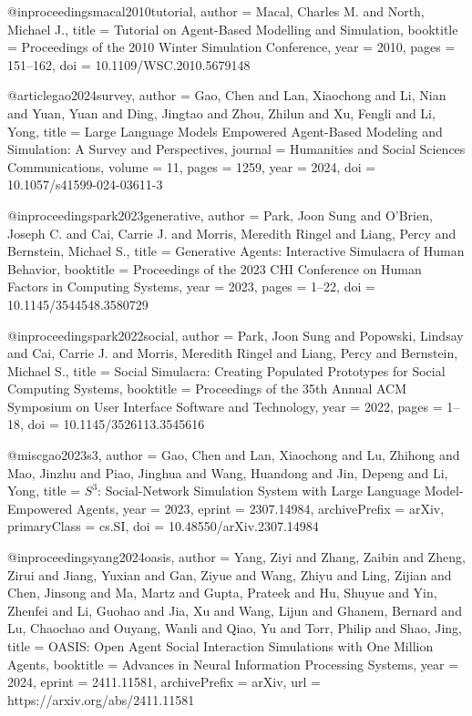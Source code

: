 @inproceedings{macal2010tutorial,
  author    = {Macal, Charles M. and North, Michael J.},
  title     = {Tutorial on Agent-Based Modelling and Simulation},
  booktitle = {Proceedings of the 2010 Winter Simulation Conference},
  year      = {2010},
  pages     = {151--162},
  doi       = {10.1109/WSC.2010.5679148}
}

@article{gao2024survey,
  author  = {Gao, Chen and Lan, Xiaochong and Li, Nian and Yuan, Yuan and Ding, Jingtao and Zhou, Zhilun and Xu, Fengli and Li, Yong},
  title   = {Large Language Models Empowered Agent-Based Modeling and Simulation: A Survey and Perspectives},
  journal = {Humanities and Social Sciences Communications},
  volume  = {11},
  pages   = {1259},
  year    = {2024},
  doi     = {10.1057/s41599-024-03611-3}
}

@inproceedings{park2023generative,
  author    = {Park, Joon Sung and O'Brien, Joseph C. and Cai, Carrie J. and Morris, Meredith Ringel and Liang, Percy and Bernstein, Michael S.},
  title     = {Generative Agents: Interactive Simulacra of Human Behavior},
  booktitle = {Proceedings of the 2023 CHI Conference on Human Factors in Computing Systems},
  year      = {2023},
  pages     = {1--22},
  doi       = {10.1145/3544548.3580729}
}

@inproceedings{park2022social,
  author    = {Park, Joon Sung and Popowski, Lindsay and Cai, Carrie J. and Morris, Meredith Ringel and Liang, Percy and Bernstein, Michael S.},
  title     = {Social Simulacra: Creating Populated Prototypes for Social Computing Systems},
  booktitle = {Proceedings of the 35th Annual ACM Symposium on User Interface Software and Technology},
  year      = {2022},
  pages     = {1--18},
  doi       = {10.1145/3526113.3545616}
}

@misc{gao2023s3,
  author        = {Gao, Chen and Lan, Xiaochong and Lu, Zhihong and Mao, Jinzhu and Piao, Jinghua and Wang, Huandong and Jin, Depeng and Li, Yong},
  title         = {{$S^3$: Social-Network Simulation System with Large Language Model-Empowered Agents}},
  year          = {2023},
  eprint        = {2307.14984},
  archivePrefix = {arXiv},
  primaryClass  = {cs.SI},
  doi           = {10.48550/arXiv.2307.14984}
}

@inproceedings{yang2024oasis,
  author    = {Yang, Ziyi and Zhang, Zaibin and Zheng, Zirui and Jiang, Yuxian and Gan, Ziyue and Wang, Zhiyu and Ling, Zijian and Chen, Jinsong and Ma, Martz and Gupta, Prateek and Hu, Shuyue and Yin, Zhenfei and Li, Guohao and Jia, Xu and Wang, Lijun and Ghanem, Bernard and Lu, Chaochao and Ouyang, Wanli and Qiao, Yu and Torr, Philip and Shao, Jing},
  title     = {{OASIS}: Open Agent Social Interaction Simulations with One Million Agents},
  booktitle = {Advances in Neural Information Processing Systems},
  year      = {2024},
  eprint    = {2411.11581},
  archivePrefix = {arXiv},
  url       = {https://arxiv.org/abs/2411.11581}
}

